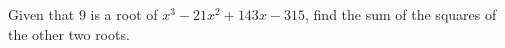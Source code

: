 Given that $9$ is a root of $x^3-21x^2+143x-315$, find the sum of the squares of the other two roots.
